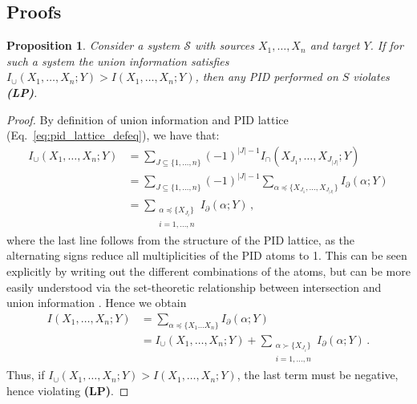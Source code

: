 \documentclass{article}
\newcommand{\Xs}{X_1,\ldots,X_n}
\newcommand{\XsY}{X_1,\ldots,X_n;Y}
\newcommand{\Ic}{\ensuremath{I_\cap}\xspace}
\newcommand{\LP}{\textbf{(LP)}\xspace}
\newtheorem{proposition}{Proposition}
\begin{document}
\subsection{Proofs}

\begin{proposition} \label{prop:Union-LP}
    Consider a system $\mathcal{S}$ with sources $\Xs$ and target $Y$. If for such a system the union information satisfies $I_\cup(\Xs;Y)>I(\Xs;Y)$, then any PID performed on $S$ violates \LP.
\end{proposition}
\begin{proof}
    By definition of union information and PID lattice (Eq.~\eqref{eq:pid_lattice_defeq}), we have that:
    \begin{equation}
    \begin{split}
        I_\cup(\Xs;Y) & = \sum_{J\subseteq\{1,\ldots,n\}} (-1)^{|J|-1} \Ic(X_{J_1}, \ldots, X_{J_{|J|}};Y) \\
        & = \sum_{J\subseteq\{1,\ldots,n\}} (-1)^{|J|-1}\sum_{\alpha\preceq \{X_{J_1}, \ldots, X_{J_{|J|}}\}} I_\partial(\alpha;Y) \\
        & = \sum_{\substack{\alpha\preceq \{X_{J_i}\}\\i=1,\ldots,n}} I_\partial(\alpha;Y) \,,
    \end{split}
    \end{equation}
    where the last line follows from the structure of the PID lattice, as the alternating signs reduce all multiplicities of the PID atoms to 1. This can be seen explicitly by writing out the different combinations of the atoms, but can be more easily understood via the set-theoretic relationship between intersection and union information \cite{williams2010nonnegative, williams2011information}.
    Hence we obtain
    \begin{equation}
    \begin{split}
        I(\XsY) & = \sum_{\alpha\preceq{\{X_1\ldots X_n\}}} I_\partial(\alpha;Y) \\
        & =I_\cup(\XsY) + \sum_{\substack{\alpha\succ \{X_{J_i}\}\\i=1,\ldots,n}}I_\partial(\alpha;Y) \,.
    \end{split}
    \end{equation}
    Thus, if $I_\cup(\XsY) > I(\XsY)$, the last term must be negative, hence violating \LP.
\end{proof}
\end{document}
